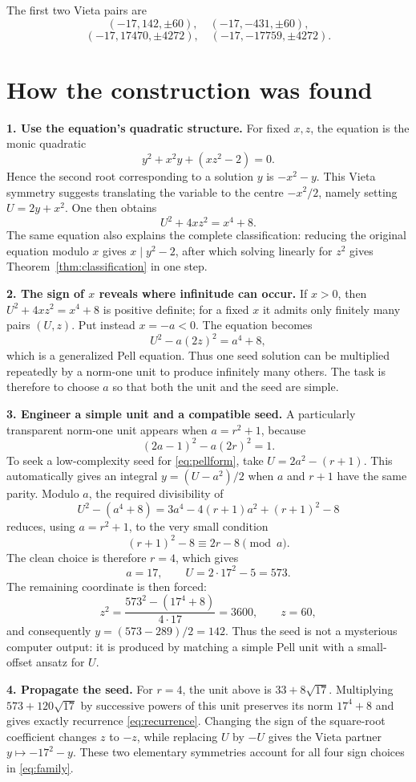 \documentclass[11pt]{article}
\theoremstyle{remark}
\begin{document}
The first two Vieta pairs are
\[
 (-17,142,\pm60),\quad (-17,-431,\pm60),
\]
\[
 (-17,17470,\pm4272),\quad (-17,-17759,\pm4272).
\]

\section{How the construction was found}

\textbf{1. Use the equation's quadratic structure.}
For fixed $x,z$, the equation is the monic quadratic
\[
 y^2+x^2y+(xz^2-2)=0.
\]
Hence the second root corresponding to a solution $y$ is $-x^2-y$.  This
Vieta symmetry suggests translating the variable to the centre
$-x^2/2$, namely setting $U=2y+x^2$.  One then obtains
\[
 U^2+4xz^2=x^4+8.
\]
The same equation also explains the complete classification: reducing the
original equation modulo $x$ gives $x\mid y^2-2$, after which solving
linearly for $z^2$ gives Theorem~\ref{thm:classification} in one step.

\textbf{2. The sign of $x$ reveals where infinitude can occur.}
If $x>0$, then $U^2+4xz^2=x^4+8$ is positive definite; for a fixed $x$ it
admits only finitely many pairs $(U,z)$.  Put instead $x=-a<0$.  The equation
becomes
\begin{equation}\label{eq:pellform}
 U^2-a(2z)^2=a^4+8,
\end{equation}
which is a generalized Pell equation.  Thus one seed solution can be
multiplied repeatedly by a norm-one unit to produce infinitely many others.
The task is therefore to choose $a$ so that both the unit and the seed are
simple.

\textbf{3. Engineer a simple unit and a compatible seed.}
A particularly transparent norm-one unit appears when
$a=r^2+1$, because
\[
 (2a-1)^2-a(2r)^2=1.
\]
To seek a low-complexity seed for \eqref{eq:pellform}, take
$U=2a^2-(r+1)$.  This automatically gives an integral
$y=(U-a^2)/2$ when $a$ and $r+1$ have the same parity.  Modulo $a$, the
required divisibility of
\[
 U^2-(a^4+8)=3a^4-4(r+1)a^2+(r+1)^2-8
\]
reduces, using $a=r^2+1$, to the very small condition
\[
 (r+1)^2-8\equiv 2r-8\pmod a.
\]
The clean choice is therefore $r=4$, which gives
\[
 a=17,\qquad U=2\cdot17^2-5=573.
\]
The remaining coordinate is then forced:
\[
 z^2=\frac{573^2-(17^4+8)}{4\cdot17}=3600,
 \qquad z=60,
\]
and consequently $y=(573-289)/2=142$.  Thus the seed is not a mysterious
computer output: it is produced by matching a simple Pell unit with a
small-offset ansatz for $U$.

\textbf{4. Propagate the seed.}
For $r=4$, the unit above is
$33+8\sqrt{17}$.  Multiplying
$573+120\sqrt{17}$ by successive powers of this unit preserves its norm
$17^4+8$ and gives exactly recurrence \eqref{eq:recurrence}.  Changing the
sign of the square-root coefficient changes $z$ to $-z$, while replacing
$U$ by $-U$ gives the Vieta partner $y\mapsto-17^2-y$.  These two elementary
symmetries account for all four sign choices in \eqref{eq:family}.
\end{document}
